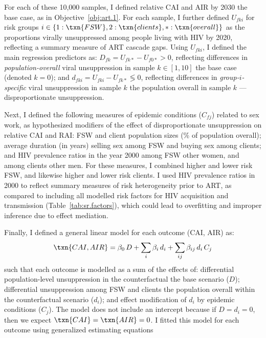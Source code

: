 \par
For each of these 10,000 samples, I defined
relative CAI and AIR by 2030 \vs the base case, as in Objective~\ref{obj:art.1}.
For each sample, I further defined
$U_{fki}$ for risk groups $i \in \{1:\txn{FSW}, 2:\txn{clients}, *:\txn{overall}\}$
as the proportions virally unsuppressed among people living with HIV by 2020,
reflecting a summary measure of ART cascade gaps.
Using $U_{fki}$, I defined the main regression predictors as:
$D_{fk} = U_{fk*} - U_{f0*} > 0$, reflecting differences in
\emph{population-overall} viral unsuppression in sample $k \in [1,10]$
\vs the base case (denoted $k = 0$); and
$d_{fki} = U_{fki} - U_{fk*} \lessgtr 0$, reflecting differences in
\emph{group-$i$-specific} viral unsuppression in sample $k$
\vs the population overall in sample $k$ --- \ie disproportionate unsuppression.
\par
Next, I defined the following measures of epidemic conditions ($C_{fj}$) related to sex work,
as hypothesized modifiers of the effect of disproportionate unsuppression on relative CAI and RAI:
FSW and client population sizes (\% of population overall);
average duration (in years) selling sex among FSW and buying sex among clients; and
HIV prevalence ratios in the year 2000 among FSW \vs other women, and among clients \vs other men.
For these measures, I combined higher and lower risk FSW,
and likewise higher and lower risk clients.
I used HIV prevalence ratios in 2000 to reflect
summary measures of risk heterogeneity prior to ART,
as compared to including all modelled risk factors
for HIV acquisition and transmission (\eg Table~\ref{tab:sr.factors}),
which could lead to overfitting and improper inference due to effect mediation. %
\par
Finally, I defined a general linear model for each outcome (CAI, AIR) as:
\begin{equation}
  \txn{CAI, AIR} = \beta_0\,D
                 + \sum_i \beta_i\,d_i
                 + \sum_{ij} \beta_{ij}\,d_i\,C_j
\end{equation}
such that each outcome is modelled as a sum of the effects of:
differential population-level unsuppression in the counterfactual
\vs the base scenario ($D$);
differential unsuppression among FSW and clients
\vs the population overall within the counterfactual scenario ($d_i$); and
effect modification of $d_i$ by epidemic conditions ($C_j$).
The model does not include an intercept because if $D = d_i = 0$,
then we expect $\txn{CAI} = \txn{AIR} = 0$.
I fitted this model for each outcome using generalized estimating equations \cite{Halekoh2006}
